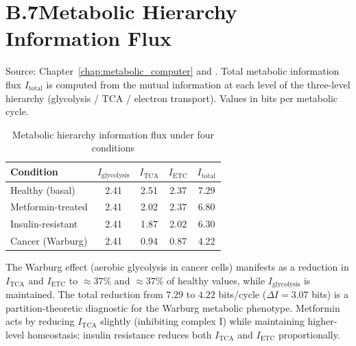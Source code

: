 \section*{B.7\quad Metabolic Hierarchy Information Flux}
\label{app:metabolic_table}

\noindent
Source: Chapter~\ref{chap:metabolic_computer} and \citet{Sachikonye2025_Metabolic}.
Total metabolic information flux $I_{\mathrm{total}}$ is computed from the
mutual information at each level of the three-level hierarchy (glycolysis /
TCA / electron transport). Values in bits per metabolic cycle.

\vspace{6pt}

\begin{table}[H]
\centering
\caption{Metabolic hierarchy information flux under four conditions}
\label{tab:metabolic_flux}
\begin{tabular}{lcccc}
\toprule
Condition & $I_{\mathrm{glycolysis}}$ & $I_{\mathrm{TCA}}$ &
$I_{\mathrm{ETC}}$ & $I_{\mathrm{total}}$ \\
\midrule
Healthy (basal)       & 2.41 & 2.51 & 2.37 & 7.29 \\
Metformin-treated     & 2.41 & 2.02 & 2.37 & 6.80 \\
Insulin-resistant     & 2.41 & 1.87 & 2.02 & 6.30 \\
Cancer (Warburg)      & 2.41 & 0.94 & 0.87 & 4.22 \\
\bottomrule
\end{tabular}
\end{table}

\noindent
The Warburg effect (aerobic glycolysis in cancer cells) manifests as a
reduction in $I_{\mathrm{TCA}}$ and $I_{\mathrm{ETC}}$ to $\approx 37\%$ and
$\approx 37\%$ of healthy values, while $I_{\mathrm{glycolysis}}$ is maintained.
The total reduction from $7.29$ to $4.22$ bits/cycle ($\Delta I = 3.07$ bits)
is a partition-theoretic diagnostic for the Warburg metabolic phenotype.
Metformin acts by reducing $I_{\mathrm{TCA}}$ slightly (inhibiting complex I)
while maintaining higher-level homeostasis; insulin resistance reduces both
$I_{\mathrm{TCA}}$ and $I_{\mathrm{ETC}}$ proportionally.
